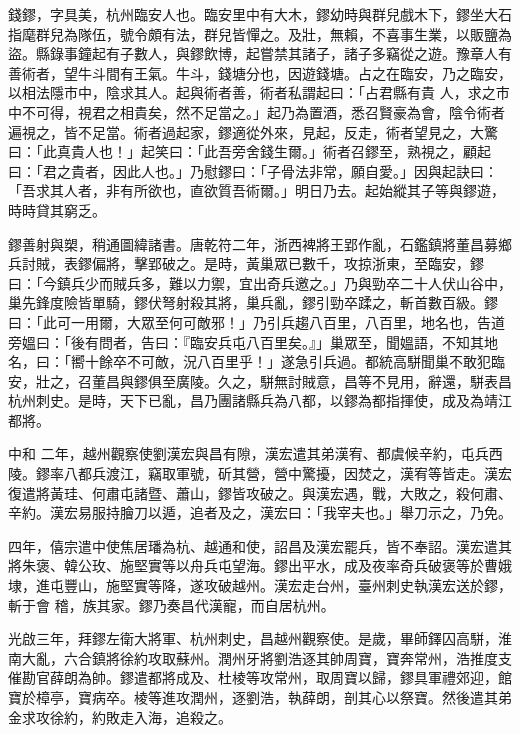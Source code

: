 
\begin{pinyinscope}

 錢鏐，字具美，杭州臨安人也。臨安里中有大木，鏐幼時與群兒戲木下，鏐坐大石指麾群兒為隊伍，號令頗有法，群兒皆憚之。及壯，無賴，不喜事生業，以販鹽為盜。縣錄事鐘起有子數人，與鏐飲博，起嘗禁其諸子，諸子多竊從之遊。豫章人有善術者，望牛斗間有王氣。牛斗，錢塘分也，因遊錢塘。占之在臨安，乃之臨安，以相法隱市中，陰求其人。起與術者善，術者私謂起曰：「占君縣有貴
 人，求之市中不可得，視君之相貴矣，然不足當之。」起乃為置酒，悉召賢豪為會，陰令術者遍視之，皆不足當。術者過起家，鏐適從外來，見起，反走，術者望見之，大驚曰：「此真貴人也！」起笑曰：「此吾旁舍錢生爾。」術者召鏐至，熟視之，顧起曰：「君之貴者，因此人也。」乃慰鏐曰：「子骨法非常，願自愛。」因與起訣曰：「吾求其人者，非有所欲也，直欲質吾術爾。」明日乃去。起始縱其子等與鏐遊，時時貸其窮乏。



 鏐善射與槊，稍通圖緯諸書。唐乾符二年，浙西裨將王郢作亂，石鑑鎮將董昌募鄉兵討賊，表鏐偏將，擊郢破之。是時，黃巢眾已數千，攻掠浙東，至臨安，鏐
 曰：「今鎮兵少而賊兵多，難以力禦，宜出奇兵邀之。」乃與勁卒二十人伏山谷中，巢先鋒度險皆單騎，鏐伏弩射殺其將，巢兵亂，鏐引勁卒蹂之，斬首數百級。鏐曰：「此可一用爾，大眾至何可敵邪！」乃引兵趨八百里，八百里，地名也，告道旁媼曰：「後有問者，告曰：『臨安兵屯八百里矣。』」巢眾至，聞媼語，不知其地名，曰：「嚮十餘卒不可敵，況八百里乎！」遂急引兵過。都統高駢聞巢不敢犯臨安，壯之，召董昌與鏐俱至廣陵。久之，駢無討賊意，昌等不見用，辭還，駢表昌杭州刺史。是時，天下已亂，昌乃團諸縣兵為八都，以鏐為都指揮使，成及為靖江都將。



 中和
 二年，越州觀察使劉漢宏與昌有隙，漢宏遣其弟漢宥、都虞候辛約，屯兵西陵。鏐率八都兵渡江，竊取軍號，斫其營，營中驚擾，因焚之，漢宥等皆走。漢宏復遣將黃珪、何肅屯諸暨、蕭山，鏐皆攻破之。與漢宏遇，戰，大敗之，殺何肅、辛約。漢宏易服持膾刀以遁，追者及之，漢宏曰：「我宰夫也。」舉刀示之，乃免。



 四年，僖宗遣中使焦居璠為杭、越通和使，詔昌及漢宏罷兵，皆不奉詔。漢宏遣其將朱褒、韓公玫、施堅實等以舟兵屯望海。鏐出平水，成及夜率奇兵破褒等於曹娥埭，進屯豐山，施堅實等降，遂攻破越州。漢宏走台州，臺州刺史執漢宏送於鏐，斬于會
 稽，族其家。鏐乃奏昌代漢寵，而自居杭州。



 光啟三年，拜鏐左衛大將軍、杭州刺史，昌越州觀察使。是歲，畢師鐸囚高駢，淮南大亂，六合鎮將徐約攻取蘇州。潤州牙將劉浩逐其帥周寶，寶奔常州，浩推度支催勘官薛朗為帥。鏐遣都將成及、杜棱等攻常州，取周寶以歸，鏐具軍禮郊迎，館寶於樟亭，寶病卒。棱等進攻潤州，逐劉浩，執薛朗，剖其心以祭寶。然後遣其弟金求攻徐約，約敗走入海，追殺之。




\end{pinyinscope}
